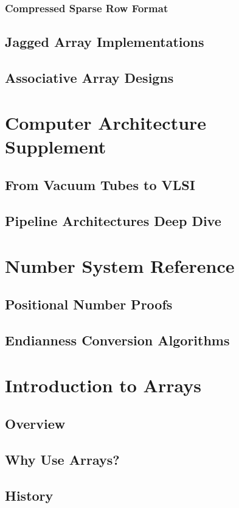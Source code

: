 \documentclass[12pt, oneside]{book}
\begin{document}
	 \subsection{Compressed Sparse Row Format}
	 \section{Jagged Array Implementations}
	 \section{Associative Array Designs}

	 \chapter{Computer Architecture Supplement}
	 \section{From Vacuum Tubes to VLSI}
	 \section{Pipeline Architectures Deep Dive}
	 
	 \chapter{Number System Reference}
	 \section{Positional Number Proofs}
	 \section{Endianness Conversion Algorithms}
	 
	\chapter{Introduction to Arrays}
	\section{Overview}
	\section{Why Use Arrays?}
	\section{History}
\end{document}
